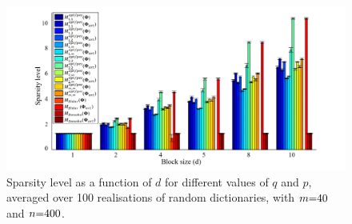 \begin{figure}[!t]
\centering
\includegraphics[width=1\textwidth,keepaspectratio]{images/Sparsity_Level_OptPes.png}
\centering
\caption{Sparsity level as a function of $d$ for different values of $q$ and $p$, averaged over 100 realisations of random dictionaries, with $m {=} 40$ and $n {=} 400$.}
\label{fig:SL}
\end{figure}